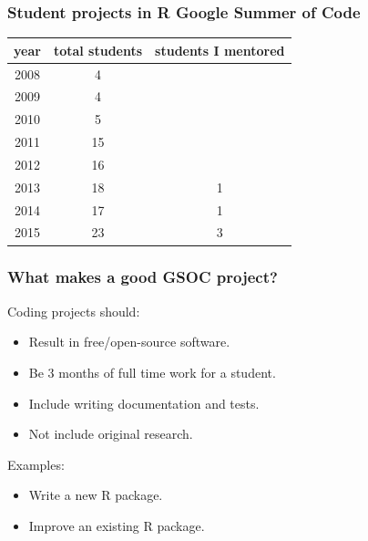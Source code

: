 \documentclass{beamer}
\begin{document}
\begin{frame}[fragile]
  \frametitle{Student projects in R Google Summer of Code}
  \begin{tabular}{ccc}
    year & total students & students I mentored \\
    \hline
    2008 & 4 \\
    2009 & 4 \\
    2010 & 5 \\
    2011 & 15 \\
    2012 & 16 \\
    2013 & 18 & 1\\
    2014 & 17 & 1\\
    2015 & 23 & 3 
  \end{tabular}
\end{frame}

\begin{frame}
  \frametitle{What makes a good GSOC project?}
  Coding projects should:
  \begin{itemize}
  \item Result in free/open-source software.
  \item Be 3 months of full time work for a student.
  \item Include writing documentation and tests.
  \item Not include original research.
  \end{itemize}
  Examples: 
  \begin{itemize}
  \item Write a new R package.
  \item Improve an existing R package.
  \end{itemize}  
\end{frame}
\end{document}
